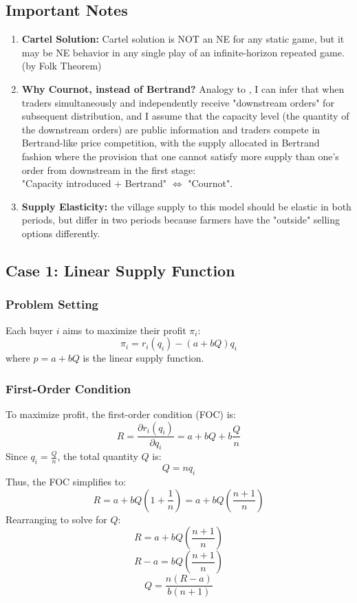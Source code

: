 \documentclass[12pt]{article}
\begin{document}
\subsection{Important Notes}
\begin{enumerate}
    \item \textbf{Cartel Solution:} Cartel solution is NOT an NE for any static game, but it may be NE behavior in any single play of an infinite-horizon repeated game. (by Folk Theorem)
    
    \item \textbf{Why Cournot, instead of Bertrand?} Analogy to \cite{kreps1983quantity}, I can infer that when traders simultaneously and independently receive "downstream orders" for subsequent distribution, and I assume that the capacity level (the quantity of the downstream orders) are public information and traders compete in Bertrand-like price competition, with the supply allocated in Bertrand fashion where the provision that one cannot satisfy more supply than one's order from downstream in the first stage: \\
    "Capacity introduced + Bertrand" $\Longleftrightarrow$ "Cournot".

    \item \textbf{Supply Elasticity:} the village supply to this model should be elastic in both periods, but differ in two periods because farmers have the "outside" selling options differently. 
\end{enumerate}


\subsection{Case 1: Linear Supply Function}

\subsubsection*{Problem Setting}

Each buyer \( i \) aims to maximize their profit \( \pi_i \):
\[
\pi_i = r_i(q_i) - (a + bQ)q_i
\]
where \( p = a + bQ \) is the linear supply function.

\subsubsection*{First-Order Condition}

To maximize profit, the first-order condition (FOC) is:
\[
R = \frac{\partial r_i(q_i)}{\partial q_i} = a + bQ + b \frac{Q}{n}
\]
Since \( q_i = \frac{Q}{n} \), the total quantity \( Q \) is:
\[
Q = nq_i
\]
Thus, the FOC simplifies to:
\[
R = a + bQ \left(1 + \frac{1}{n}\right) = a + bQ \left(\frac{n+1}{n}\right)
\]
Rearranging to solve for \( Q \):
\[
R = a + bQ \left(\frac{n+1}{n}\right)
\]
\[
R - a = bQ \left(\frac{n+1}{n}\right)
\]
\[
Q = \frac{n(R - a)}{b(n+1)}
\]
\end{document}
